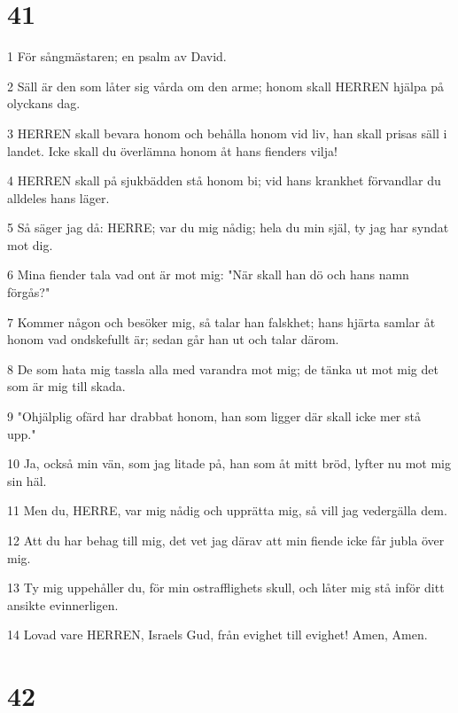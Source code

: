 \chapter{41}

\par 1 För sångmästaren; en psalm av David.
\par 2 Säll är den som låter sig vårda om den arme; honom skall HERREN hjälpa på olyckans dag.
\par 3 HERREN skall bevara honom och behålla honom vid liv, han skall prisas säll i landet. Icke skall du överlämna honom åt hans fienders vilja!
\par 4 HERREN skall på sjukbädden stå honom bi; vid hans krankhet förvandlar du alldeles hans läger.
\par 5 Så säger jag då: HERRE; var du mig nådig; hela du min själ, ty jag har syndat mot dig.
\par 6 Mina fiender tala vad ont är mot mig: "När skall han dö och hans namn förgås?"
\par 7 Kommer någon och besöker mig, så talar han falskhet; hans hjärta samlar åt honom vad ondskefullt är; sedan går han ut och talar därom.
\par 8 De som hata mig tassla alla med varandra mot mig; de tänka ut mot mig det som är mig till skada.
\par 9 "Ohjälplig ofärd har drabbat honom, han som ligger där skall icke mer stå upp."
\par 10 Ja, också min vän, som jag litade på, han som åt mitt bröd, lyfter nu mot mig sin häl.
\par 11 Men du, HERRE, var mig nådig och upprätta mig, så vill jag vedergälla dem.
\par 12 Att du har behag till mig, det vet jag därav att min fiende icke får jubla över mig.
\par 13 Ty mig uppehåller du, för min ostrafflighets skull, och låter mig stå inför ditt ansikte evinnerligen.
\par 14 Lovad vare HERREN, Israels Gud, från evighet till evighet! Amen, Amen.

\chapter{42}

